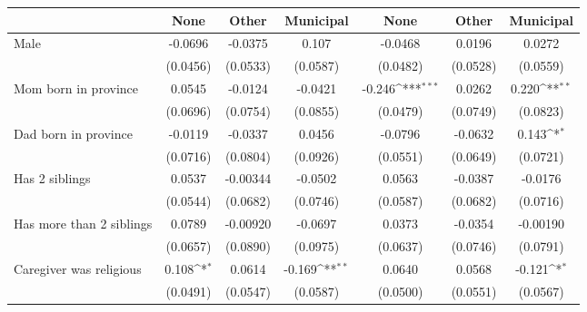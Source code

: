 {
\def\sym#1{\ifmmode^{#1}\else\(^{#1}\)\fi}
\begin{tabular}{l*{6}{c}}
\toprule
                    &\multicolumn{1}{c}{None}&\multicolumn{1}{c}{Other}&\multicolumn{1}{c}{Municipal}&\multicolumn{1}{c}{None}&\multicolumn{1}{c}{Other}&\multicolumn{1}{c}{Municipal}\\
\midrule
Male                &     -0.0696         &     -0.0375         &       0.107         &     -0.0468         &      0.0196         &      0.0272         \\
                    &    (0.0456)         &    (0.0533)         &    (0.0587)         &    (0.0482)         &    (0.0528)         &    (0.0559)         \\
\addlinespace
Mom born in province&      0.0545         &     -0.0124         &     -0.0421         &      -0.246\sym{***}&      0.0262         &       0.220\sym{**} \\
                    &    (0.0696)         &    (0.0754)         &    (0.0855)         &    (0.0479)         &    (0.0749)         &    (0.0823)         \\
\addlinespace
Dad born in province&     -0.0119         &     -0.0337         &      0.0456         &     -0.0796         &     -0.0632         &       0.143\sym{*}  \\
                    &    (0.0716)         &    (0.0804)         &    (0.0926)         &    (0.0551)         &    (0.0649)         &    (0.0721)         \\
\addlinespace
Has 2 siblings      &      0.0537         &    -0.00344         &     -0.0502         &      0.0563         &     -0.0387         &     -0.0176         \\
                    &    (0.0544)         &    (0.0682)         &    (0.0746)         &    (0.0587)         &    (0.0682)         &    (0.0716)         \\
\addlinespace
Has more than 2 siblings&      0.0789         &    -0.00920         &     -0.0697         &      0.0373         &     -0.0354         &    -0.00190         \\
                    &    (0.0657)         &    (0.0890)         &    (0.0975)         &    (0.0637)         &    (0.0746)         &    (0.0791)         \\
\addlinespace
Caregiver was religious&       0.108\sym{*}  &      0.0614         &      -0.169\sym{**} &      0.0640         &      0.0568         &      -0.121\sym{*}  \\
                    &    (0.0491)         &    (0.0547)         &    (0.0587)         &    (0.0500)         &    (0.0551)         &    (0.0567)         \\

\end{tabular}}
